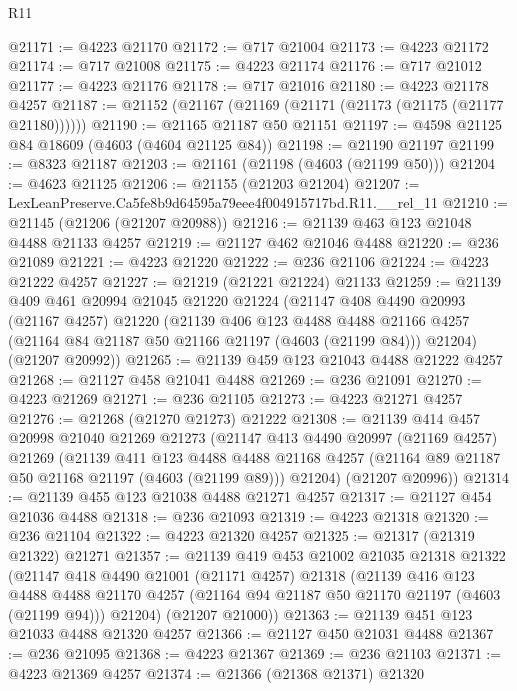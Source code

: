 \begin{lexlean}{R11}
\begin{coremodule}
@21171 := @4223 @21170
@21172 := @717 @21004
@21173 := @4223 @21172
@21174 := @717 @21008
@21175 := @4223 @21174
@21176 := @717 @21012
@21177 := @4223 @21176
@21178 := @717 @21016
@21180 := @4223 @21178 @4257
@21187 := @21152 (@21167 (@21169 (@21171 (@21173 (@21175 (@21177 @21180))))))
@21190 := @21165 @21187 @50 @21151
@21197 := @4598 @21125 @84 @18609 (@4603 (@4604 @21125 @84))
@21198 := @21190 @21197
@21199 := @8323 @21187
@21203 := @21161 (@21198 (@4603 (@21199 @50)))
@21204 := @4623 @21125
@21206 := @21155 (@21203 @21204)
@21207 := LexLeanPreserve.Ca5fe8b9d64595a79eee4f004915717bd.R11.__rel_11
@21210 := @21145 (@21206 (@21207 @20988))
@21216 := @21139 @463 @123 @21048 @4488 @21133 @4257
@21219 := @21127 @462 @21046 @4488
@21220 := @236 @21089
@21221 := @4223 @21220
@21222 := @236 @21106
@21224 := @4223 @21222 @4257
@21227 := @21219 (@21221 @21224) @21133
@21259 := @21139
    @409
    @461
    @20994
    @21045
    @21220
    @21224
    (@21147
      @408
      @4490
      @20993
      (@21167 @4257)
      @21220
      (@21139
        @406
        @123
        @4488
        @4488
        @21166
        @4257
        (@21164 @84 @21187 @50 @21166 @21197 (@4603 (@21199 @84)))
        @21204)
      (@21207 @20992))
@21265 := @21139 @459 @123 @21043 @4488 @21222 @4257
@21268 := @21127 @458 @21041 @4488
@21269 := @236 @21091
@21270 := @4223 @21269
@21271 := @236 @21105
@21273 := @4223 @21271 @4257
@21276 := @21268 (@21270 @21273) @21222
@21308 := @21139
    @414
    @457
    @20998
    @21040
    @21269
    @21273
    (@21147
      @413
      @4490
      @20997
      (@21169 @4257)
      @21269
      (@21139
        @411
        @123
        @4488
        @4488
        @21168
        @4257
        (@21164 @89 @21187 @50 @21168 @21197 (@4603 (@21199 @89)))
        @21204)
      (@21207 @20996))
@21314 := @21139 @455 @123 @21038 @4488 @21271 @4257
@21317 := @21127 @454 @21036 @4488
@21318 := @236 @21093
@21319 := @4223 @21318
@21320 := @236 @21104
@21322 := @4223 @21320 @4257
@21325 := @21317 (@21319 @21322) @21271
@21357 := @21139
    @419
    @453
    @21002
    @21035
    @21318
    @21322
    (@21147
      @418
      @4490
      @21001
      (@21171 @4257)
      @21318
      (@21139
        @416
        @123
        @4488
        @4488
        @21170
        @4257
        (@21164 @94 @21187 @50 @21170 @21197 (@4603 (@21199 @94)))
        @21204)
      (@21207 @21000))
@21363 := @21139 @451 @123 @21033 @4488 @21320 @4257
@21366 := @21127 @450 @21031 @4488
@21367 := @236 @21095
@21368 := @4223 @21367
@21369 := @236 @21103
@21371 := @4223 @21369 @4257
@21374 := @21366 (@21368 @21371) @21320

\end{coremodule}
\end{lexlean}
